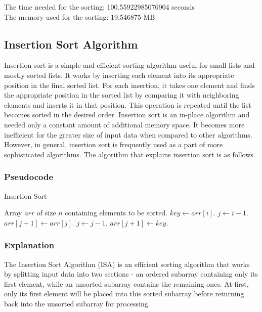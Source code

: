 \documentclass{article}
\begin{document}
The time needed for the sorting: 100.55922985076904 seconds \\
The memory used for the sorting: 19.546875 MB

\subsection{Insertion Sort Algorithm}

Insertion sort is a simple and efficient sorting algorithm useful for small lists and
mostly sorted lists. It works by inserting each element into its appropriate position in
the final sorted list. For each insertion, it takes one element and finds the appropriate
position in the sorted list by comparing it with neighboring elements and inserts it in
that position. This operation is repeated until the list becomes sorted in the desired
order. Insertion sort is an in-place algorithm and needed only a constant amount
of additional memory space. It becomes more inefficient for the greater size of
input data when compared to other algorithms. However, in general, insertion sort
is frequently used as a part of more sophisticated algorithms. The algorithm that
explains insertion sort is as follows.\cite{karunanithi2014survey}

\subsubsection{Pseudocode}

\begin{algorithm}[H]
\caption{Insertion Sort}
\begin{algorithmic}[1]
\REQUIRE Array $arr$ of size $n$ containing elements to be sorted.
    \STATE $key \gets arr[i]$.
    \STATE $j \gets i-1$.
        \STATE $arr[j+1] \gets arr[j]$.
        \STATE $j \gets j-1$.
    \ENDWHILE
    \STATE $arr[j+1] \gets key$.
\ENDFOR
\end{algorithmic}
\end{algorithm}

\subsubsection{Explanation}

The Insertion Sort Algorithm (ISA) is an efficient sorting algorithm that works by splitting input data into two sections - an ordered subarray containing only its first element, while an unsorted subarray contains the remaining ones. At first, only its first element will be placed into this sorted subarray before returning back into the unsorted subarray for processing.
\end{document}
